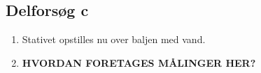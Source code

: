 \documentclass{article} %
\newcounter{source}
\begin{document}
\subsection{Delforsøg c}
\begin{enumerate}
	\item Stativet opstilles nu over baljen med vand. 
	\item \textbf{HVORDAN FORETAGES MÅLINGER HER?}
\end{enumerate}























\end{document}

